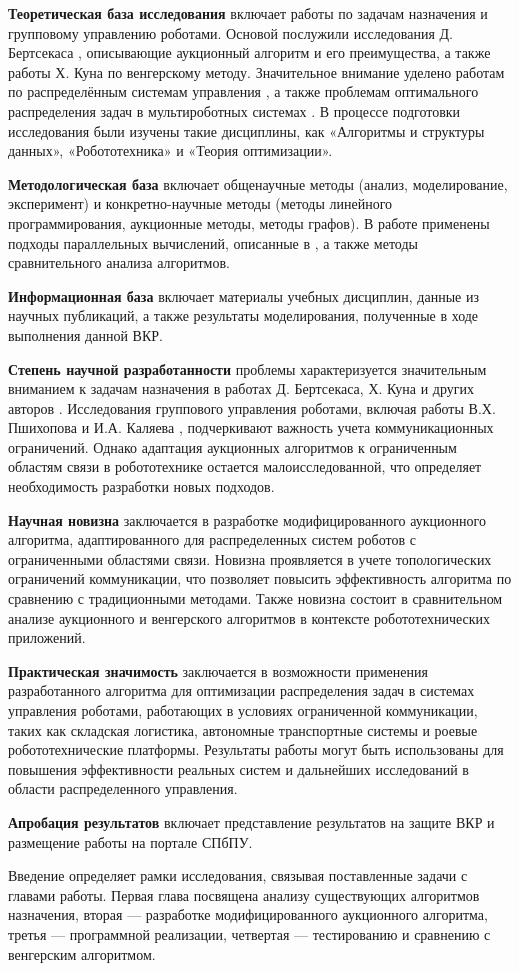 \textbf{Теоретическая база исследования} включает работы по задачам назначения и групповому управлению роботами. Основой послужили исследования Д. Бертсекаса \cite{bertsekas1990}, описывающие аукционный алгоритм и его преимущества, а также работы Х. Куна \cite{kuhn1955} по венгерскому методу. Значительное внимание уделено работам по распределённым системам управления \cite{pshikhopov2015, kalyaev2009}, а также проблемам оптимального распределения задач в мультироботных системах \cite{gerkey2003}. В процессе подготовки исследования были изучены такие дисциплины, как «Алгоритмы и структуры данных», «Робототехника» и «Теория оптимизации».

\textbf{Методологическая база} включает общенаучные методы (анализ, моделирование, эксперимент) и конкретно-научные методы (методы линейного программирования, аукционные методы, методы графов). В работе применены подходы параллельных вычислений, описанные в \cite{bertsekas1990}, а также методы сравнительного анализа алгоритмов.

\textbf{Информационная база} включает материалы учебных дисциплин, данные из научных публикаций, а также результаты моделирования, полученные в ходе выполнения данной ВКР.

\textbf{Степень научной разработанности} проблемы характеризуется значительным вниманием к задачам назначения в работах Д. Бертсекаса, Х. Куна и других авторов \cite{bertsekas1990, kuhn1955, bertsekas1989, gerkey2003}. Исследования группового управления роботами, включая работы В.Х. Пшихопова \cite{pshikhopov2015} и И.А. Каляева \cite{kalyaev2009}, подчеркивают важность учета коммуникационных ограничений. Однако адаптация аукционных алгоритмов к ограниченным областям связи в робототехнике остается малоисследованной, что определяет необходимость разработки новых подходов.

\textbf{Научная новизна} заключается в разработке модифицированного аукционного алгоритма, адаптированного для распределенных систем роботов с ограниченными областями связи. Новизна проявляется в учете топологических ограничений коммуникации, что позволяет повысить эффективность алгоритма по сравнению с традиционными методами. Также новизна состоит в сравнительном анализе аукционного и венгерского алгоритмов в контексте робототехнических приложений.

\textbf{Практическая значимость} заключается в возможности применения разработанного алгоритма для оптимизации распределения задач в системах управления роботами, работающих в условиях ограниченной коммуникации, таких как складская логистика, автономные транспортные системы и роевые робототехнические платформы. Результаты работы могут быть использованы для повышения эффективности реальных систем и дальнейших исследований в области распределенного управления.

\textbf{Апробация результатов} включает представление результатов на защите ВКР и размещение работы на портале СПбПУ.

Введение определяет рамки исследования, связывая поставленные задачи с главами работы. Первая глава посвящена анализу существующих алгоритмов назначения, вторая — разработке модифицированного аукционного алгоритма, третья — программной реализации, четвертая — тестированию и сравнению с венгерским алгоритмом.
